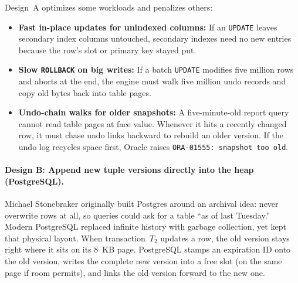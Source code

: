 Design~A optimizes some workloads and penalizes others:
\begin{itemize}
  \item \textbf{Fast in-place updates for unindexed columns:} If an \texttt{UPDATE} leaves secondary index columns untouched, secondary indexes need no new entries because the row's slot or primary key stayed put.
  \item \textbf{Slow \texttt{ROLLBACK} on big writes:} If a batch \texttt{UPDATE} modifies five million rows and aborts at the end, the engine must walk five million undo records and copy old bytes back into table pages.
  \item \textbf{Undo-chain walks for older snapshots:} A five-minute-old report query cannot read table pages at face value. Whenever it hits a recently changed row, it must chase undo links backward to rebuild an older version. If the undo log recycles space first, Oracle raises \texttt{ORA-01555: snapshot too old}.
\end{itemize}

\paragraph{Design B: Append new tuple versions directly into the heap (PostgreSQL).}
Michael Stonebraker originally built Postgres around an archival idea: never overwrite rows at all, so queries could ask for a table ``as of last Tuesday.'' Modern PostgreSQL replaced infinite history with garbage collection, yet kept that physical layout. When transaction~$T_2$ updates a row, the old version stays right where it sits on its 8~KB page. PostgreSQL stamps an expiration ID onto the old version, writes the complete new version into a free slot (on the same page if room permits), and links the old version forward to the new one.

